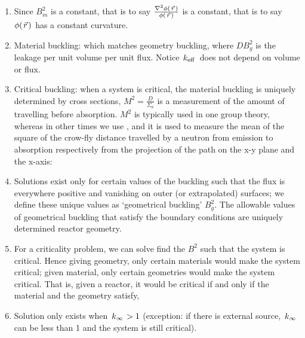 \documentclass{school-22.211-notes}
\begin{document}
\begin{enumerate}
\item Since $B_m^2$ is a constant, that is to say $\frac{\nabla^2 \phi(\left.\vec{r}\right.)}{\phi(\left.\vec{r}\right.)}$ is a constant, that is to say $\phi(\left.\vec{r}\right.)$ has a constant curvature. 
\item Material buckling: 
  which matches geometry buckling, 
  where $DB^2_g$ is the leakage per unit volume per unit flux. Notice $\left. k_{\mathrm{eff}} \right.$ does not depend on volume or flux. 

\item Critical buckling: when a system is critical, the material buckling is uniquely determined by cross sections, 
   $M^2 = \frac{D}{\Sigma_a}$ is a measurement of the amount of travelling before absorption. $M^2$ is typically used in one group theory, whereas in other times we use , and it is used to measure the mean of the square of the crow-fly distance travelled by a neutron from emission to absorption respectively from the projection of the path on the x-y plane and the x-axis: 

\item Solutions exist only for certain values of the buckling such that the flux is everywhere positive and vanishing on outer (or extrapolated) surfaces; we define these unique values as `geometrical buckling' $B_g^2$. The allowable values of geometrical buckling that satisfy the boundary conditions are uniquely determined reactor geometry.

\item For a criticality problem, we can solve find the $B^2$ such that the system is critical. Hence giving geometry, only certain materials would make the system critical; given material, only certain geometries would make the system critical. That is, given a reactor, it would be critical if and only if the material and the geometry satisfy,

\item Solution only exists when $\left. k_{\infty} \right. > 1$ (exception: if there is external source, $\left. k_{\infty} \right.$ can be less than 1 and the system is still critical). 
\end{enumerate}
\end{document}
